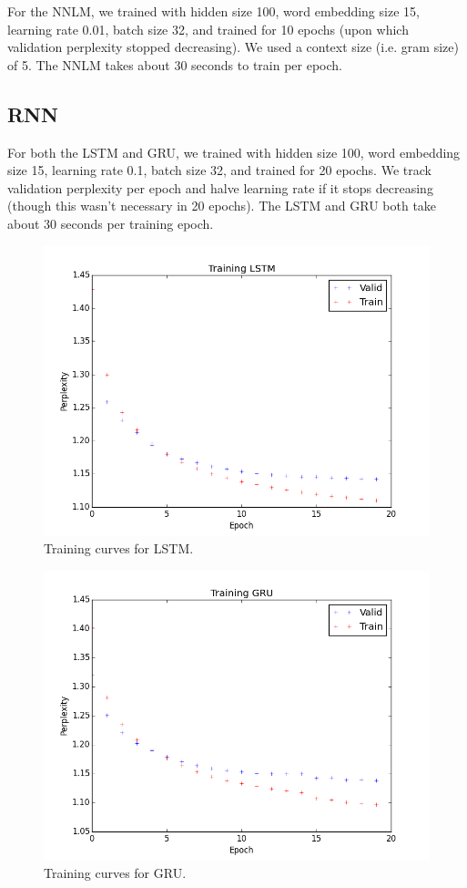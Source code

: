 \documentclass[11pt]{article}
\begin{document}
For the NNLM, we trained with hidden size 100, word embedding size 15, learning rate 0.01, batch size 32, and trained for 10 epochs (upon which validation perplexity stopped decreasing). We used a context size (i.e. gram size) of 5. The NNLM takes about 30 seconds to train per epoch.

\subsection{RNN}

For both the LSTM and GRU, we trained with hidden size 100, word embedding size 15, learning rate 0.1, batch size 32, and trained for 20 epochs. We track validation perplexity per epoch and halve learning rate if it stops decreasing (though this wasn't necessary in 20 epochs). The LSTM and GRU both take about 30 seconds per training epoch.


\begin{figure}[h]
\centering
\includegraphics[scale=0.5]{train_lstm}
\caption{Training curves for LSTM.}
\end{figure}

\begin{figure}[H]
\centering
\includegraphics[scale=0.5]{train_gru}
\caption{Training curves for GRU.}
\end{figure}
\end{document}

